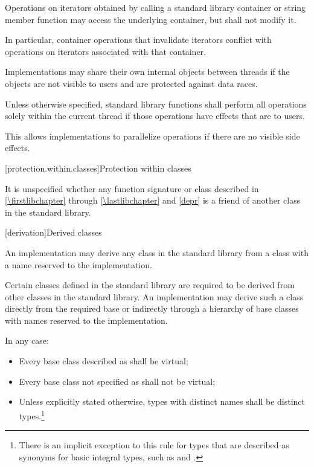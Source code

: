 \pnum
Operations on iterators obtained by calling a standard library container or string
member function may access the underlying container, but shall not modify it.
\begin{note}
In particular, container operations that invalidate iterators conflict
with operations on iterators associated with that container.
\end{note}

\pnum
Implementations may share their own internal objects between threads if the objects are
not visible to users and are protected against data races.

\pnum
Unless otherwise specified, \Cpp{} standard library functions shall perform all operations
solely within the current thread if those operations have effects that are
 to users.

\pnum
\begin{note}
This allows implementations to parallelize operations if there are no visible
%
side effects.
\end{note}

[protection.within.classes]{Protection within classes}

\pnum
{}%
It is unspecified whether any function signature or class described in
\ref{\firstlibchapter} through \ref{\lastlibchapter} and \ref{depr} is a
friend of another class in the \Cpp{} standard library.

[derivation]{Derived classes}

\pnum
{}%
%
An implementation may derive any class in the \Cpp{} standard library from a class with a
name reserved to the implementation.

\pnum
Certain classes defined in the \Cpp{} standard library are required to be derived from
other classes
in the \Cpp{} standard library.
%
An implementation may derive such a class directly from the required base or indirectly
through a hierarchy of base classes with names reserved to the implementation.

\pnum
In any case:
\begin{itemize}
\item
Every base class described as
shall be virtual;
%
\item
Every base class not specified as
 shall not be virtual;
\item
Unless explicitly stated otherwise, types with distinct names shall be distinct
types.\footnote{There is an implicit exception to this rule for types that are
described as synonyms for basic integral types, such as
 and
.}
\end{itemize}

